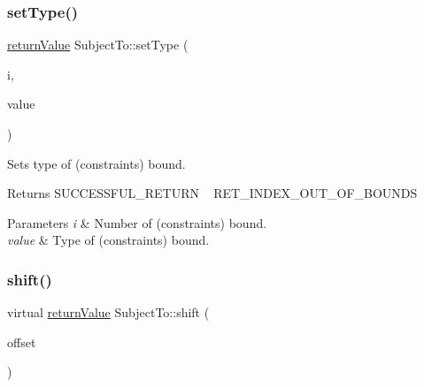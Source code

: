 \subsubsection{\texorpdfstring{set\+Type()}{setType()}}
{\footnotesize\ttfamily \hyperlink{_message_handling_8hpp_a81d556f613bfbabd0b1f9488c0fa865e}{return\+Value} Subject\+To\+::set\+Type (\begin{DoxyParamCaption}\item[{\hyperlink{_types_8hpp_ab6fd6105e64ed14a0c9281326f05e623}{int\+\_\+t}}]{i,  }\item[{\hyperlink{_types_8hpp_a3e65c061dde41562d1aeb2c4453bf1d3}{Subject\+To\+Type}}]{value }\end{DoxyParamCaption})\hspace{0.3cm}{\ttfamily [inline]}}

Sets type of (constraints\textquotesingle{}) bound. \begin{DoxyReturn}{Returns}
S\+U\+C\+C\+E\+S\+S\+F\+U\+L\+\_\+\+R\+E\+T\+U\+RN ~\newline
 R\+E\+T\+\_\+\+I\+N\+D\+E\+X\+\_\+\+O\+U\+T\+\_\+\+O\+F\+\_\+\+B\+O\+U\+N\+DS 
\end{DoxyReturn}

\begin{DoxyParams}{Parameters}
{\em i} & Number of (constraints\textquotesingle{}) bound. \\
\hline
{\em value} & Type of (constraints\textquotesingle{}) bound. \\
\hline
\end{DoxyParams}
\mbox{\label{class_subject_to_af584328614003c2b9e92b185c6ceedc9}} 
\subsubsection{\texorpdfstring{shift()}{shift()}}
{\footnotesize\ttfamily virtual \hyperlink{_message_handling_8hpp_a81d556f613bfbabd0b1f9488c0fa865e}{return\+Value} Subject\+To\+::shift (\begin{DoxyParamCaption}\item[{\hyperlink{_types_8hpp_ab6fd6105e64ed14a0c9281326f05e623}{int\+\_\+t}}]{offset }\end{DoxyParamCaption})\hspace{0.3cm}{\ttfamily [pure virtual]}}

